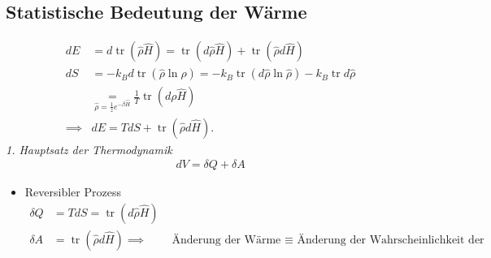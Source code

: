 \documentclass[11pt]{article}
\theoremstyle{plain}
\newcommand{\trace}{\operatorname{tr}}
\begin{document}
\subsection*{Statistische Bedeutung der W\"arme}
%
\begin{align*}
  dE & = d \trace \left( \hat{\rho} \hat{H} \right) = 
  \trace\left( d \hat{\rho} \hat{H} \right) + 
  \trace \left( \hat{\rho} d \hat{H} \right)  \\
  dS & = -k_B d \trace \left( \hat{\rho} \ln{ \hat{\rho}} \right) = 
  - k_B \trace \left( d \hat{\rho} \ln{ \hat{\rho}} \right) - k_B \trace d \hat{\rho} \\
   & \underset{\hat{\rho} = \frac{1}{z } e^{- \beta \hat{ H}}}{=} 
  \frac{1}{T} \trace (d\rho \hat{H}) \\
\implies & dE = T dS + \trace \left( \hat{\rho} d \hat{H} \right).
\end{align*}
\emph{1. Hauptsatz der Thermodynamik} 
%
\begin{align*}
  dV = \delta Q + \delta A
\end{align*}
%
\begin{itemize}
  \item Reversibler Prozess
    \begin{align*}
      \delta Q & = T dS = \trace \left( d \hat{\rho} \hat{H} \right) \\
      \delta A & = \trace \left( \hat{\rho} d \hat{H} \right)
      \implies & \text{ \"Anderung der W\"arme $\equiv$ 
    \"Anderung der Wahrscheinlichkeit der Mikrozust\"ande}
    \end{align*}
\end{itemize}
\end{document}
